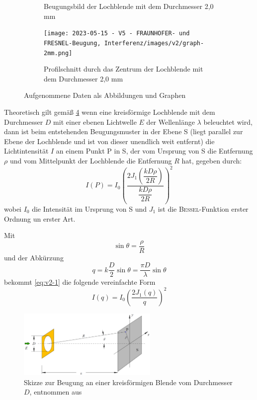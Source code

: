 \documentclass[../protokoll.tex]{subfiles}
\begin{document}
\begin{figure}[H]
\begin{subfigure}[t]{0.24\textwidth}
        \caption{Beugungsbild der Lochblende mit dem Durchmesser 2,0 mm}
        \label{fig:v2-beugung-2}
    \end{subfigure}
    \hfill
    \begin{subfigure}[t]{0.24\textwidth}
        \texttt{[image: 2023-05-15 - V5 - FRAUNHOFER- und FRESNEL-Beugung, Interferenz/images/v2/graph-2mm.png]}
        \caption{Profilschnitt durch das Zentrum der Lochblende mit dem Durchmesser 2,0 mm}
        \label{fig:v2-schnitt-2}
    \end{subfigure}
    \caption{Aufgenommene Daten als Abbildungen und Graphen}
    \label{fig:v2}
\end{figure}

Theoretisch gilt gemäß \cref{fig:skizze-durchmesser} wenn eine kreisförmige Lochblende mit dem Durchmesser $D$ mit einer ebenen Lichtwelle $E$ der Wellenlänge $\lambda$ beleuchtet wird, dann ist beim entstehenden Beugungsmuster in der Ebene S (liegt parallel zur Ebene der Lochblende und ist von dieser unendlich weit entfernt) die Lichtintensität $I$ an einem Punkt P in S, der vom Ursprung von S die Entfernung $\rho$ und vom Mittelpunkt der Lochblende die Entfernung $R$ hat, gegeben durch:
\begin{equation}\label{eq:v2-1}
    I(P) = I_0 \left( \dfrac{
        2 J_1 \left( \dfrac{k D \rho}{2 R} \right)
    }{
        \dfrac{k D \rho}{2 R}
    } \right)^2
\end{equation}
wobei $I_0$ die Intensität im Ursprung von S und $J_1$ ist die \textsc{Bessel}-Funktion erster Ordnung un erster Art.

Mit
\begin{equation}\label{eq:v2-0}
    \sin \theta = \dfrac{\rho}{R}
\end{equation}
und der Abkürzung
\begin{equation}\label{eq:v2-0.5}
    q = k \dfrac{D}{2} \sin \theta = \dfrac{\pi D}{\lambda} \sin \theta
\end{equation}
bekommt \cref{eq:v2-1} die folgende vereinfachte Form
\begin{equation}
    I(q) = I_0 \left( \dfrac{2 J_1(q)}{q} \right)^2
\end{equation}
\begin{figure}[H]
    \centering
    \includegraphics[width=0.6\textwidth]{2023-05-15 - V5 - FRAUNHOFER- und FRESNEL-Beugung, Interferenz/images/v2/skizze-v2.png}
    \caption{Skizze zur Beugung an einer kreisförmigen Blende vom Durchmesser $D$, entnommen aus \cite{script}}
    \label{fig:skizze-durchmesser}
\end{figure}
\end{document}
